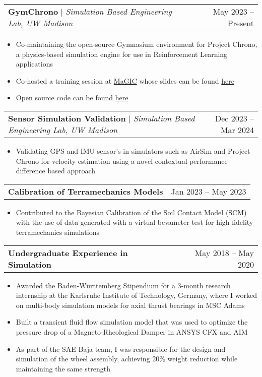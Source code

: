 \documentclass[letterpaper,11pt]{article}
\makeatletter
\newcommand{\resumeItem}[1]{
  \item\small{
    {#1 \vspace{-2pt}}
  }
}
\newcommand{\resumeProjectHeading}[2]{
    \item
    \begin{tabular*}{0.97\textwidth}{l@{\extracolsep{\fill}}r}
      \small#1 & #2 \\
    \end{tabular*}\vspace{-7pt}
}
\newcommand{\resumeItemListStart}{\begin{itemize}}
\newcommand{\resumeItemListEnd}{\end{itemize}\vspace{-5pt}}
\makeatother
\begin{document}
        \resumeProjectHeading
        {\textbf{GymChrono} $|$ \footnotesize\emph{Simulation Based Engineering Lab, UW Madison}}{May 2023 -- Present}
        \resumeItemListStart
            \resumeItem{Co-maintaining the open-source Gymnasium environment for Project Chrono, a physics-based simulation engine for use in Reinforcement Learning applications}
            \resumeItem{Co-hosted a training session at \href{https://sbel.wisc.edu/magic-2023/}{MaGIC} whose slides can be found \href{https://uwmadison.box.com/s/l4ahegpgm01lo5wl2tgai05futrtyda8}{here}}
            \resumeItem{Open source code can be found \href{https://github.com/projectchrono/gym-chrono}{here}}

          \resumeItemListEnd
          
      \resumeProjectHeading
        {\textbf{Sensor Simulation Validation} $|$ \footnotesize\emph{Simulation Based Engineering Lab, UW Madison}}{Dec 2023 -- Mar 2024}
        \resumeItemListStart
            \resumeItem{Validating GPS and IMU sensor's in simulators such as AirSim and Project Chrono for velocity estimation using a novel contextual performance difference based approach}
        \resumeItemListEnd

        \resumeProjectHeading
        {\textbf{Calibration of Terramechanics Models}}{Jan 2023 -- May 2023}
        \resumeItemListStart
            \resumeItem{Contributed to the Bayesian Calibration of the Soil Contact Model (SCM) with the use of data generated with a virtual bevameter test for high-fidelity terramechanics simulations}

        \resumeItemListEnd

        \resumeProjectHeading
        {\textbf{Undergraduate Experience in Simulation}}{May 2018 -- May 2020}
        \resumeItemListStart
            \resumeItem{Awarded the Baden-Württemberg Stipendium for a 3-month research internship at the Karlsruhe Institute of Technology, Germany, where I worked on multi-body simulation models for axial thrust bearings in MSC Adams}
            \resumeItem{Built a transient fluid flow simulation model that was used to optimize the pressure drop of a Magneto-Rheological Damper in ANSYS CFX and AIM}
            \resumeItem{As part of the SAE Baja team, I was responsible for the design and simulation of the wheel assembly, achieving 20\% weight reduction while maintaining the same strength}
        \resumeItemListEnd
\end{document}
